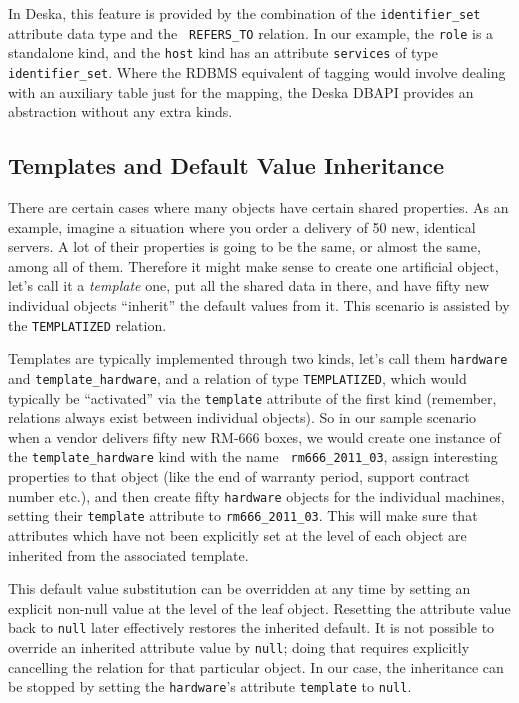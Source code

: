 \documentclass[deska]{subfiles}
\begin{document}
In Deska, this feature is provided by the combination of the {\tt identifier\_set} attribute data type and the {\tt
REFERS\_TO} relation.  In our example, the {\tt role} is a standalone kind, and the {\tt host} kind has an attribute
{\tt services} of type {\tt identifier\_set}.  Where the RDBMS equivalent of tagging would involve dealing with an
auxiliary table just for the mapping, the Deska DBAPI provides an abstraction without any extra kinds.

\subsection{Templates and Default Value Inheritance}

There are certain cases where many objects have certain shared properties.  As an example, imagine a situation where you
order a delivery of 50 new, identical servers.  A lot of their properties is going to be the same, or almost the same,
among all of them.  Therefore it might make sense to create one artificial object, let's call it a {\em template} one,
put all the shared data in there, and have fifty new individual objects ``inherit'' the default values from it.  This
scenario is assisted by the {\tt TEMPLATIZED} relation.

Templates are typically implemented through two kinds, let's call them {\tt hardware} and {\tt template\_hardware}, and
a relation of type {\tt TEMPLATIZED}, which would typically be ``activated'' via the {\tt template} attribute of the
first kind (remember, relations always exist between individual objects).  So in our sample scenario when a vendor
delivers fifty new RM-666 boxes, we would create one instance of the {\tt template\_hardware} kind with the name {\tt
rm666\_2011\_03}, assign interesting properties to that object (like the end of warranty period, support contract number
etc.), and then create fifty {\tt hardware} objects for the individual machines, setting their {\tt template} attribute
to {\tt rm666\_2011\_03}.  This will make sure that attributes which have not been explicitly set at the level of each
object are inherited from the associated template.

This default value substitution can be overridden at any time by setting an explicit non-null value at the level of the
leaf object.  Resetting the attribute value back to {\tt null} later effectively restores the inherited default.  It is
not possible to override an inherited attribute value by {\tt null}; doing that requires explicitly cancelling the
relation for that particular object.  In our case, the inheritance can be stopped by setting the {\tt hardware}'s
attribute {\tt template} to {\tt null}.
\end{document}
